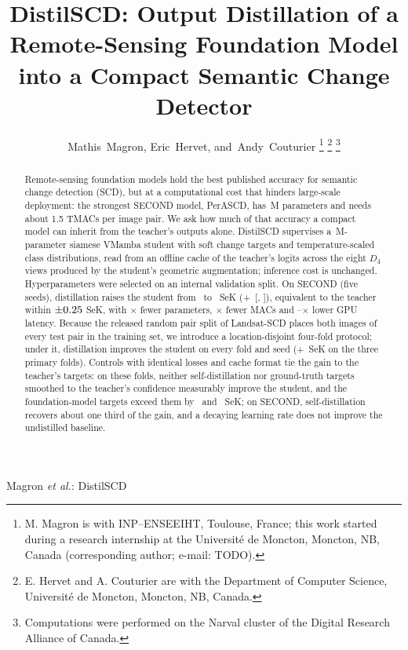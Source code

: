 \documentclass[journal]{IEEEtran}
\begin{document}
\title{DistilSCD: Output Distillation of a Remote-Sensing Foundation Model into a Compact
Semantic Change Detector}

\author{Mathis~Magron, Eric~Hervet, and~Andy~Couturier%
\thanks{M. Magron is with INP--ENSEEIHT, Toulouse, France; this work started during a research
internship at the Universit\'e de Moncton, Moncton, NB, Canada (corresponding author; e-mail:
TODO).}%
\thanks{E. Hervet and A. Couturier are with the Department of Computer Science, Universit\'e de
Moncton, Moncton, NB, Canada.}%
\thanks{Computations were performed on the Narval cluster of the Digital Research Alliance of
Canada.}}

%
{Magron \MakeLowercase{\textit{et al.}}: DistilSCD}

\maketitle

\begin{abstract}
Remote-sensing foundation models hold the best published accuracy for semantic change detection
(SCD), but at a computational cost that hinders large-scale deployment: the strongest SECOND model,
PerASCD, has \TeacherParams\,M parameters and needs about 1.5 TMACs per image pair. We ask how much
of that accuracy a compact model can inherit from the teacher's outputs alone. DistilSCD supervises
a \StudentParams\,M-parameter siamese VMamba student with soft change targets and temperature-scaled
class distributions, read from an offline cache of the teacher's logits across the eight $D_4$ views
produced by the student's geometric augmentation; inference cost is unchanged. Hyperparameters were
selected on an internal validation split. On SECOND (five seeds), distillation raises the student
from \SecBaseSek\ to \SecFullSek\ SeK (+\SecFullGain\ [\SecFullGainLo, \SecFullGainHi]), equivalent
to the teacher within $\pm0.25$ SeK, with \RatioParams$\times$ fewer parameters,
\RatioGmacs$\times$ fewer MACs and \RatioLatOneBf--\RatioLatFpThirtyTwo$\times$ lower GPU latency.
Because the released random pair split of Landsat-SCD places both images of every test pair in the
training set, we introduce a location-disjoint four-fold protocol; under it, distillation improves
the student on every fold and seed (+\LPrimGain\ SeK on the three primary folds). Controls with
identical losses and cache format tie the gain to the teacher's targets: on these folds, neither
self-distillation nor ground-truth targets smoothed to the teacher's confidence measurably improve
the student, and the foundation-model targets exceed them by \RevKdSelfLanAbs\ and \RevKdCtlLanAbs\
SeK; on SECOND, self-distillation recovers about one third of the gain, and a decaying learning rate
does not improve the undistilled baseline.
\end{abstract}
\end{document}
